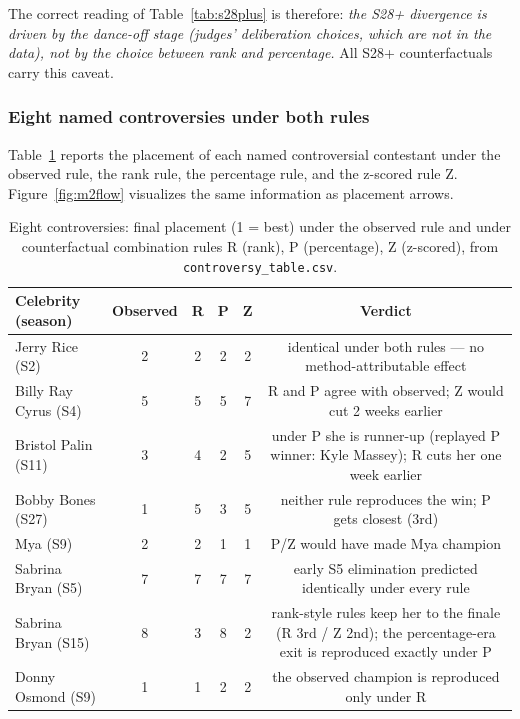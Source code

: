 \documentclass[10pt]{article}
\begin{document}
The correct reading of Table~\ref{tab:s28plus} is therefore: \emph{the S28+ divergence is
driven by the dance-off stage (judges' deliberation choices, which are not in the data),
not by the choice between rank and percentage.} All S28+ counterfactuals carry this caveat.

\subsubsection{Eight named controversies under both rules}

Table~\ref{tab:controversies} reports the placement of each named controversial
contestant under the observed rule, the rank rule, the percentage rule, and the z-scored
rule Z. Figure~\ref{fig:m2flow} visualizes the same information as placement arrows.

\begin{table}[H]
\centering
\caption{Eight controversies: final placement (1 = best) under the observed rule and
under counterfactual combination rules R (rank), P (percentage), Z (z-scored), from
\texttt{controversy\_table.csv}.}
\label{tab:controversies}
\begin{tabular}{lccccc}
\toprule
Celebrity (season) & Observed & R & P & Z & Verdict \\
\midrule
Jerry Rice (S2)         & 2 & 2 & 2 & 2 & identical under both rules --- no method-attributable effect \\
Billy Ray Cyrus (S4)    & 5 & 5 & 5 & 7 & R and P agree with observed; Z would cut 2 weeks earlier \\
Bristol Palin (S11)     & 3 & 4 & 2 & 5 & under P she is runner-up (replayed P winner: Kyle Massey); R cuts her one week earlier \\
Bobby Bones (S27)       & 1 & 5 & 3 & 5 & neither rule reproduces the win; P gets closest (3rd) \\
Mya (S9)                & 2 & 2 & 1 & 1 & P/Z would have made Mya champion \\
Sabrina Bryan (S5)      & 7 & 7 & 7 & 7 & early S5 elimination predicted identically under every rule \\
Sabrina Bryan (S15)     & 8 & 3 & 8 & 2 & rank-style rules keep her to the finale (R 3rd / Z 2nd); the percentage-era exit is reproduced exactly under P \\
Donny Osmond (S9)       & 1 & 1 & 2 & 2 & the observed champion is reproduced only under R \\
\bottomrule
\end{tabular}
\end{table}
\end{document}
